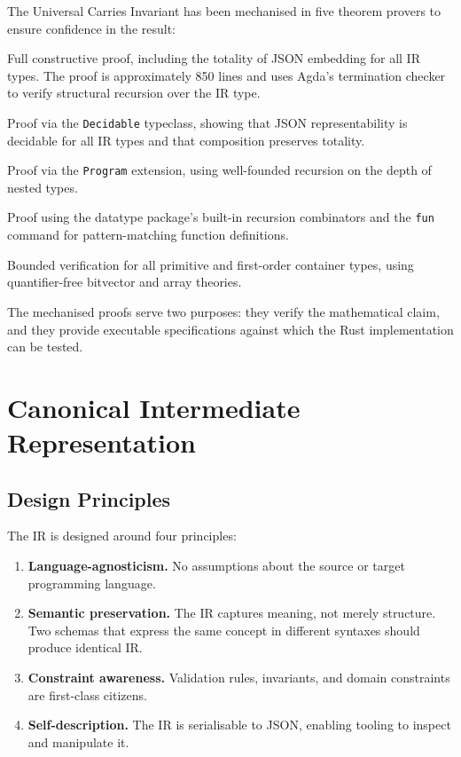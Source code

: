 \documentclass[11pt,a4paper]{article}
\theoremstyle{definition}
\theoremstyle{remark}
\begin{document}
The Universal Carries Invariant has been mechanised in five theorem
provers to ensure confidence in the result:

\begin{description}[leftmargin=*]
  \item[Agda.] Full constructive proof, including the totality of
    JSON embedding for all IR types. The proof is approximately 850
    lines and uses Agda's termination checker to verify structural
    recursion over the IR type.

  \item[Lean~4.] Proof via the \texttt{Decidable} typeclass,
    showing that JSON representability is decidable for all IR types
    and that composition preserves totality.

  \item[Coq.] Proof via the \texttt{Program} extension, using
    well-founded recursion on the depth of nested types.

  \item[Isabelle/HOL.] Proof using the datatype package's
    built-in recursion combinators and the \texttt{fun} command for
    pattern-matching function definitions.

  \item[Z3.] Bounded verification for all primitive and first-order
    container types, using quantifier-free bitvector and array
    theories.
\end{description}

The mechanised proofs serve two purposes: they verify the mathematical
claim, and they provide executable specifications against which the
Rust implementation can be tested.

\section{Canonical Intermediate Representation}\label{sec:ir}

\subsection{Design Principles}

The IR is designed around four principles:
\begin{enumerate}
  \item \textbf{Language-agnosticism.} No assumptions about the source
    or target programming language.
  \item \textbf{Semantic preservation.} The IR captures meaning, not
    merely structure. Two schemas that express the same concept in
    different syntaxes should produce identical IR.
  \item \textbf{Constraint awareness.} Validation rules, invariants,
    and domain constraints are first-class citizens.
  \item \textbf{Self-description.} The IR is serialisable to JSON,
    enabling tooling to inspect and manipulate it.
\end{enumerate}
\end{document}
